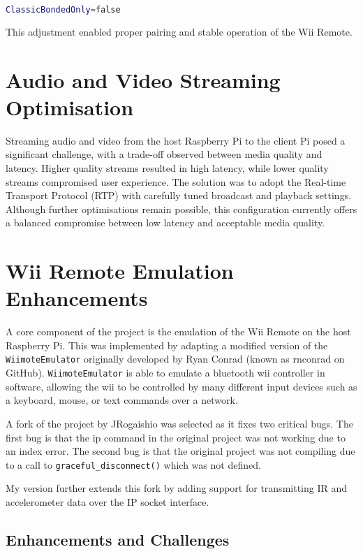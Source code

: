 \begin{lstlisting}[language=bash]
ClassicBondedOnly=false
\end{lstlisting}

This adjustment enabled proper pairing and stable operation of the Wii Remote.

\section{Audio and Video Streaming Optimisation}
Streaming audio and video from the host Raspberry Pi to the client Pi posed a significant challenge, with a trade-off observed between media quality and latency. Higher quality streams resulted in high latency, while lower quality streams compromised user experience. The solution was to adopt the Real-time Transport Protocol (RTP) with carefully tuned broadcast and playback settings. Although further optimisations remain possible, this configuration currently offers a balanced compromise between low latency and acceptable media quality.


\section{Wii Remote Emulation Enhancements}

A core component of the project is the emulation of the Wii Remote on the host Raspberry Pi. This was implemented by adapting a modified version of the \texttt{WiimoteEmulator} originally developed by Ryan Conrad\cite{wiimote_emulator} (known as rnconrad on GitHub). \texttt{WiimoteEmulator} is able to emulate a bluetooth wii controller in software, allowing the wii to be controlled by many different input devices such as a keyboard, mouse, or text commands over a network.

A fork of the project by JRogaishio\cite{jr_wiimote_emu} was selected as it fixes two critical bugs. The first
bug is that the ip command in the original project was not working due to an index error. The second bug is that the original project was not compiling due to a call to \texttt{graceful\_disconnect()} which was not defined.

My version\cite{kf_wiimote_emu} further extends this fork by adding support for transmitting IR and accelerometer data over the IP socket interface.

\subsection*{Enhancements and Challenges}


